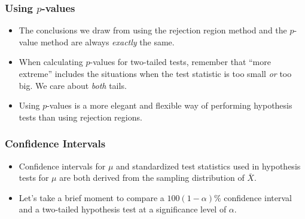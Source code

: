 \documentclass[14pt]{beamer}
\begin{document}
\begin{frame}
	\frametitle{Using $p$-values}
	
	\begin{itemize}[label={\color{blue}$\blacktriangleright$}]
		\item The conclusions we draw from using the rejection region method and the $p$-value method are always \emph{exactly} the same.
		
		\item When calculating $p$-values for two-tailed tests, remember that ``more extreme'' includes the situations when the test statistic is too small \emph{or} too big. We care about \emph{both} tails.
		
		\item Using $p$-values is a more elegant and flexible way of performing hypothesis tests than using rejection regions.
	\end{itemize}
	
\end{frame}
\begin{frame}
	\frametitle{Confidence Intervals}
	
	\begin{itemize}[label={\color{blue}$\blacktriangleright$}]
		\item Confidence intervals for $\mu$ and standardized test statistics used in hypothesis tests for $\mu$ are both derived from the sampling distribution of $\bar{X}$.
		
		\item Let's take a brief moment to compare a $100(1-\alpha)\%$ confidence interval and a two-tailed hypothesis test at a significance level of $\alpha$.
	\end{itemize}
	
\end{frame}
\end{document}
